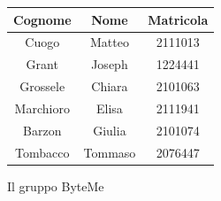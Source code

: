 \documentclass[11pt,a4paper]{article}
\begin{document}
\begin{table}[H]
    \centering
    \begin{tabular}{|c|c|c|}
        \hline
        \textbf{Cognome} & \textbf{Nome} & \textbf{Matricola} \\
        \hline
        Cuogo & Matteo & 2111013 \\
        \hline
        Grant & Joseph & 1224441 \\
        \hline
        Grossele & Chiara & 2101063 \\
        \hline
        Marchioro & Elisa & 2111941 \\
        \hline
        Barzon & Giulia & 2101074 \\
        \hline
        Tombacco & Tommaso & 2076447 \\
        \hline
    \end{tabular}
\end{table}

\hfill Il gruppo ByteMe
\end{document}

